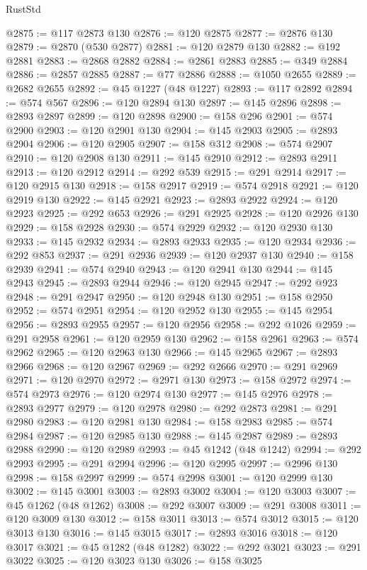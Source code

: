 \begin{lexlean}{RustStd}
\begin{coremodule}
{\begin{coremodule}
{{{{{{{{{{{{{{{{{{{{{{{{{{{{{{{{{{{{{{{{{{{{{{{{{{{{{{{{{{{{@2875 := @117 @2873 @130
@2876 := @120 @2875
@2877 := @2876 @130
@2879 := @2870 (@530 @2877)
@2881 := @120 @2879 @130
@2882 := @192 @2881
@2883 := @2868 @2882
@2884 := @2861 @2883
@2885 := @349 @2884
@2886 := @2857 @2885
@2887 := @77 @2886
@2888 := @1050 @2655
@2889 := @2682 @2655
@2892 := @45 @1227 (@48 @1227)
@2893 := @117 @2892
@2894 := @574 @567
@2896 := @120 @2894 @130
@2897 := @145 @2896
@2898 := @2893 @2897
@2899 := @120 @2898
@2900 := @158 @296
@2901 := @574 @2900
@2903 := @120 @2901 @130
@2904 := @145 @2903
@2905 := @2893 @2904
@2906 := @120 @2905
@2907 := @158 @312
@2908 := @574 @2907
@2910 := @120 @2908 @130
@2911 := @145 @2910
@2912 := @2893 @2911
@2913 := @120 @2912
@2914 := @292 @539
@2915 := @291 @2914
@2917 := @120 @2915 @130
@2918 := @158 @2917
@2919 := @574 @2918
@2921 := @120 @2919 @130
@2922 := @145 @2921
@2923 := @2893 @2922
@2924 := @120 @2923
@2925 := @292 @653
@2926 := @291 @2925
@2928 := @120 @2926 @130
@2929 := @158 @2928
@2930 := @574 @2929
@2932 := @120 @2930 @130
@2933 := @145 @2932
@2934 := @2893 @2933
@2935 := @120 @2934
@2936 := @292 @853
@2937 := @291 @2936
@2939 := @120 @2937 @130
@2940 := @158 @2939
@2941 := @574 @2940
@2943 := @120 @2941 @130
@2944 := @145 @2943
@2945 := @2893 @2944
@2946 := @120 @2945
@2947 := @292 @923
@2948 := @291 @2947
@2950 := @120 @2948 @130
@2951 := @158 @2950
@2952 := @574 @2951
@2954 := @120 @2952 @130
@2955 := @145 @2954
@2956 := @2893 @2955
@2957 := @120 @2956
@2958 := @292 @1026
@2959 := @291 @2958
@2961 := @120 @2959 @130
@2962 := @158 @2961
@2963 := @574 @2962
@2965 := @120 @2963 @130
@2966 := @145 @2965
@2967 := @2893 @2966
@2968 := @120 @2967
@2969 := @292 @2666
@2970 := @291 @2969
@2971 := @120 @2970
@2972 := @2971 @130
@2973 := @158 @2972
@2974 := @574 @2973
@2976 := @120 @2974 @130
@2977 := @145 @2976
@2978 := @2893 @2977
@2979 := @120 @2978
@2980 := @292 @2873
@2981 := @291 @2980
@2983 := @120 @2981 @130
@2984 := @158 @2983
@2985 := @574 @2984
@2987 := @120 @2985 @130
@2988 := @145 @2987
@2989 := @2893 @2988
@2990 := @120 @2989
@2993 := @45 @1242 (@48 @1242)
@2994 := @292 @2993
@2995 := @291 @2994
@2996 := @120 @2995
@2997 := @2996 @130
@2998 := @158 @2997
@2999 := @574 @2998
@3001 := @120 @2999 @130
@3002 := @145 @3001
@3003 := @2893 @3002
@3004 := @120 @3003
@3007 := @45 @1262 (@48 @1262)
@3008 := @292 @3007
@3009 := @291 @3008
@3011 := @120 @3009 @130
@3012 := @158 @3011
@3013 := @574 @3012
@3015 := @120 @3013 @130
@3016 := @145 @3015
@3017 := @2893 @3016
@3018 := @120 @3017
@3021 := @45 @1282 (@48 @1282)
@3022 := @292 @3021
@3023 := @291 @3022
@3025 := @120 @3023 @130
@3026 := @158 @3025
}}}}}}}}}}}}}}}}}}}}}}}}}}}}}}}}}}}}}}}}}}}}}}}}}}}}}}}}}}}}
\end{coremodule}}
\end{coremodule}
\end{lexlean}
